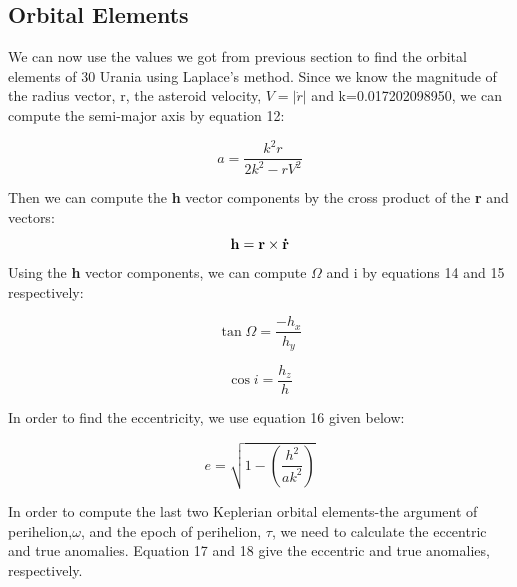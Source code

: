 \documentclass[letterpaper,12pt]{article}
\begin{document}
\subsection{Orbital Elements}
We can now use the values we got from previous section to find the orbital elements of 30 Urania using Laplace's method. Since we know the magnitude of the radius vector, r, the asteroid velocity, \begin{math}V=|\dot{r}| \end{math} and k=0.017202098950, we can compute the semi-major axis by equation 12:

\begin{equation}
a=\frac{k^2r}{2k^2-rV^2}
\end{equation}

Then we can compute the {\bf h} vector components by the cross product of the {\bf r} and {\bf {}} vectors:
\begin{equation}
{\bf h}= {\bf r} \times {\bf \dot{r}}
\end{equation}
Using the {\bf h} vector components, we can compute \begin{math} \Omega \end{math} and i by equations 14 and 15 respectively:

\begin{equation}
\tan \Omega = \frac{-h_{x}}{h_{y}}
\end{equation}

\begin{equation}
\cos i = \frac{h_{z}}{h}
\end{equation}

In order to find the eccentricity, we use equation 16 given below:

\begin{equation}
e=\sqrt{1-(\frac{h^2}{ak^2})}
\end{equation}

In order to compute the last two Keplerian orbital elements-the argument of perihelion,\begin{math} \omega \end{math}, and the epoch of perihelion, \begin{math} \tau \end{math}, we need to calculate the eccentric and true anomalies. Equation 17 and 18 give the eccentric and true anomalies, respectively.
\end{document}
